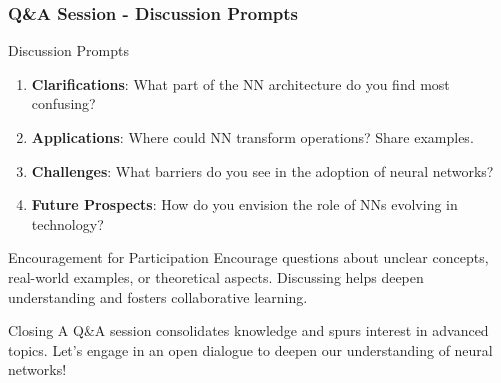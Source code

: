 \documentclass[aspectratio=169]{beamer}
\begin{document}
\begin{frame}[fragile]
    \frametitle{Q\&A Session - Discussion Prompts}
    \begin{block}{Discussion Prompts}
        \begin{enumerate}
            \item \textbf{Clarifications}: What part of the NN architecture do you find most confusing? 
            \item \textbf{Applications}: Where could NN transform operations? Share examples.
            \item \textbf{Challenges}: What barriers do you see in the adoption of neural networks?
            \item \textbf{Future Prospects}: How do you envision the role of NNs evolving in technology?
        \end{enumerate}
    \end{block}
    
    \begin{block}{Encouragement for Participation}
        Encourage questions about unclear concepts, real-world examples, or theoretical aspects. 
        Discussing helps deepen understanding and fosters collaborative learning.
    \end{block}
    
    \begin{block}{Closing}
        A Q&A session consolidates knowledge and spurs interest in advanced topics. 
        Let’s engage in an open dialogue to deepen our understanding of neural networks!
    \end{block}
\end{frame}
\end{document}
